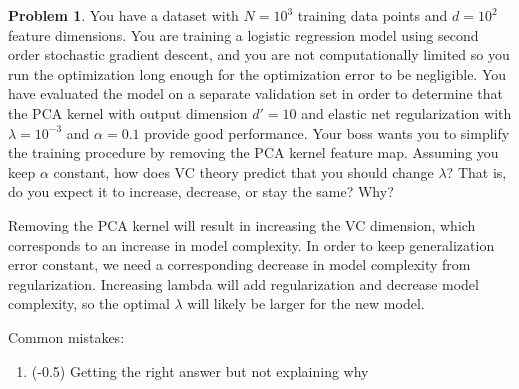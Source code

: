 \documentclass[10pt]{exam}
\theoremstyle{definition}
\newtheorem{problem}{Problem}
\begin{document}
\newpage
\begin{problem}
    You have a dataset with $N=10^3$ training data points and $d=10^2$ feature dimensions.
    You are training a logistic regression model using second order stochastic gradient descent,
    and you are not computationally limited so you run the optimization long enough for the optimization error to be negligible.
    You have evaluated the model on a separate validation set in order to determine that the PCA kernel with output dimension $d'=10$ and elastic net regularization with $\lambda=10^{-3}$ and $\alpha=0.1$ provide good performance.
    Your boss wants you to simplify the training procedure by removing the PCA kernel feature map.
    Assuming you keep $\alpha$ constant, how does VC theory predict that you should change $\lambda$?
    That is, do you expect it to increase, decrease, or stay the same?
    Why?
\end{problem}
\begin{solution}
    Removing the PCA kernel will result in increasing the VC dimension, which corresponds to an increase in model complexity.
    In order to keep generalization error constant,
    we need a corresponding decrease in model complexity from regularization.
    Increasing lambda will add regularization and decrease model complexity, so the optimal $\lambda$ will likely be larger for the new model.

    \vspace{0.2in}
    \noindent
    Common mistakes:
    \begin{enumerate}
        \item (-0.5) Getting the right answer but not explaining why
    \end{enumerate}
\end{solution}
\end{document}
